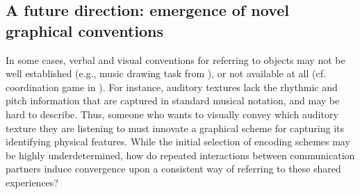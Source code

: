 \documentclass[12pt]{article}
\begin{document}
\subsection{A future direction: emergence of novel graphical conventions}

In some cases, verbal and visual conventions for referring to objects may not be well established (e.g., music drawing task from ), or not available at all (cf. coordination game in ). For instance, auditory textures \cite{McDermott:2013ky} lack the rhythmic and pitch information that are captured in standard musical notation, and may be hard to describe. Thus, someone who wants to visually convey which auditory texture they are listening to must innovate a graphical scheme for capturing its identifying physical features. While the initial selection of encoding schemes may be highly underdetermined, how do repeated interactions between communication partners induce convergence upon a consistent way of referring to these shared experiences?


\setlength{\bibleftmargin}{.125in}
\setlength{\bibindent}{-\bibleftmargin}

\end{document}
